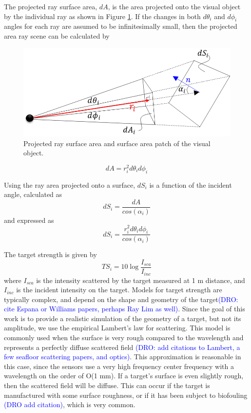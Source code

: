 \documentclass[utf8]{frontiersSCNS} %
\begin{document}
The projected ray surface area, $dA$, is the area projected onto the visual object by the individual ray as shown in Figure \ref{f:projectsurface}. If the changes in both $d\theta_i$ and $d\phi_i$ angles for each ray are assumed to be infinitesimally small, then the projected area ray scene can be calculated by

\begin{figure}[ht]
  \centering
  \includegraphics[width=\columnwidth]{images/sonar_surface.png}
  \caption{Projected ray surface area and surface area patch of the visual object.}
  \label{f:projectsurface}
\end{figure} 

\begin{equation}
    dA = r_i^2 d \theta_i d \phi_i
\end{equation}

Using the ray area projected onto a surface, $dS_i$ is a function of the incident angle, calculated as
\begin{equation}
    dS_i = \frac{dA}{cos(\alpha_i)}
\end{equation}
and expressed as
\begin{equation}
    dS_i = \frac{r_i^2 d \theta_i d \phi_i}{cos(\alpha_i)}
\end{equation}

The target strength is given by 
\begin{equation}
    TS_i = 10 \log\frac{I_{sca}}{I_{inc}}
\end{equation}
where $I_{sca}$ is the intensity scattered by the target measured at 1 m distance, and $I_{inc}$ is the incident intensity on the target. Models for target strength are typically complex, and depend on the shape and geometry of the target\textcolor{blue}{(DRO: cite Espana or Williams papers, perhaps Ray Lim as well)}. Since the goal of this work is to provide a realistic simulation of the geometry of a target, but not its amplitude, we use the empirical Lambert's law for scattering. This model is commonly used when the surface is very rough compared to the wavelength and represents a perfectly diffuse scattered field \textcolor{blue}{(DRO: add citations to Lambert, a few seafloor scattering papers, and optics)}. This approximation is reasonable in this case, since the sensors use a very high frequency center frequency with a wavelength on the order of O(1 mm). If a target's surface is even slightly rough, then the scattered field will be diffuse. This can occur if the target is manufactured with some surface roughness, or if it has been subject to biofouling \textcolor{blue}{(DRO add citation)}, which is very common.
\end{document}
